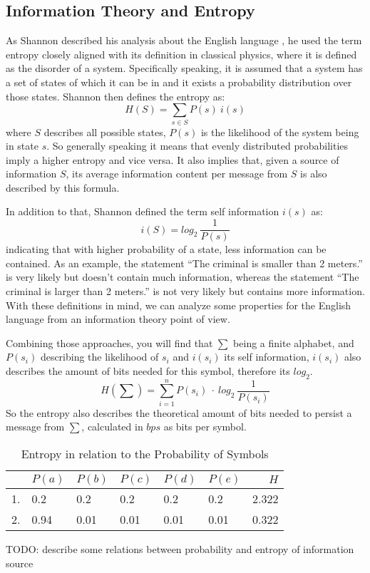 \subsection{Information Theory and Entropy}
\par{
As Shannon described his analysis about the English language \cite{entropy}, he used the term entropy closely aligned with its definition in classical physics, where it is defined as the disorder of a system. Specifically speaking, it is assumed that a system has a set of states of which it can be in and it exists a probability distribution over those states. Shannon then defines the entropy as:
\[
H(S) = \sum_{s \in S} P(s) \: i(s)
\]
where $S$ describes all possible states, $P(s)$ is the likelihood of the system being in state $s$. So generally speaking it means that evenly distributed probabilities imply a higher entropy and vice versa.
It also implies that, given a source of information $S$, its average information content per message from $S$ is also described by this formula.}

\par{
In addition to that, Shannon defined the term self information $i(s)$ as:
\[
i(S) = log_{2} \: \frac{1}{P(s)}
\]
indicating that with higher probability of a state, less information can be contained. As an example, the statement \enquote{The criminal is smaller than 2 meters.} is very likely but doesn't contain much information, whereas the statement \enquote{The criminal is larger than 2 meters.} is not very likely but contains more information. With these definitions in mind, we can analyze some properties for the English language from an information theory point of view.
}

\par{
Combining those approaches, you will find that $\sum$ being a finite alphabet, and $P(s_i)$ describing the likelihood of $s_i$ and $i(s_i)$ its self information, $i(s_i)$ also describes the amount of bits needed for this symbol, therefore its $log_2$.
\[
	H(\sum) = \sum_{i = 1}^{n} P(s_i) \: \cdot \: log_{2} \: \frac{1}{P(s_i) }
\]
So the entropy 	also describes the theoretical amount of bits needed to persist a message from $\sum$, calculated in $bps$ as bits per symbol.

\begin{table}
	\centering
\begin{tabular}[p]{l|l|l|l|l|l|r}
	& $P(a)$ & $P(b)$ & $P(c)$ & $P(d)$ & $P(e)$ & $H$ \\
	\hline
	1. & 0.2 & 0.2 & 0.2 & 0.2 & 0.2 & 2.322 \\
	2. & 0.94 & 0.01 & 0.01 & 0.01 & 0.01 & 0.322
	\label{tab:heisetabelle}
\end{tabular}
	\caption{Entropy in relation to the Probability of Symbols}
\end{table}


TODO: describe some relations between probability and entropy of information source
}
